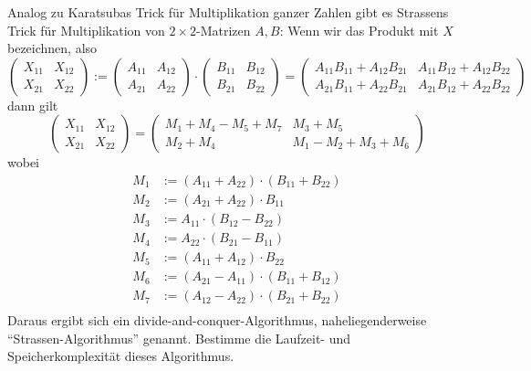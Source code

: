 \begin{sheet}
    \begin{problem}[title={Strassens Matrixmultiplikationsalgorithmus}]
        Analog zu Karatsubas Trick für Multiplikation ganzer Zahlen gibt es Strassens Trick für Multiplikation von $2\times 2$-Matrizen $A,B$: Wenn wir das Produkt mit $X$ bezeichnen, also
        \[ \begin{pmatrix}
               X_{11} & X_{12} \\ X_{21} & X_{22}
        \end{pmatrix} :=
        \begin{pmatrix}
            A_{11} & A_{12} \\ A_{21} & A_{22}
        \end{pmatrix} \cdot
        \begin{pmatrix}
            B_{11} & B_{12} \\ B_{21} & B_{22}
        \end{pmatrix} = \begin{pmatrix}
                            A_{11} B_{11}+ A_{12} B_{21}  & A_{11} B_{12} + A_{12} B_{22} \\
                            A_{21} B_{11} + A_{22} B_{21} & A_{21} B_{12} +A_{22} B_{22}
        \end{pmatrix}\]
        dann gilt
        \[\begin{pmatrix}
              X_{11} & X_{12} \\ X_{21} & X_{22}
        \end{pmatrix} =
        \begin{pmatrix}
            M_1 + M_4 - M_5 + M_7 & M_3 + M_5             \\
            M_2 + M_4             & M_1 - M_2 + M_3 + M_6
        \end{pmatrix}\]
        wobei
        \begin{align*}
            M_1 &:= (A_{11} + A_{22}) \cdot (B_{11} + B_{22}) \\
            M_2 &:= (A_{21} + A_{22}) \cdot B_{11} \\
            M_3 &:= A_{11} \cdot (B_{12} - B_{22}) \\
            M_4 &:= A_{22} \cdot (B_{21} - B_{11}) \\
            M_5 &:= (A_{11} + A_{12}) \cdot B_{22} \\
            M_6 &:= (A_{21} - A_{11}) \cdot (B_{11} + B_{12}) \\
            M_7 &:= (A_{12} - A_{22}) \cdot (B_{21} + B_{22}) \\
        \end{align*}
        Daraus ergibt sich ein divide-and-conquer-Algorithmus, naheliegenderweise \enquote{Strassen-Algorithmus} genannt. Bestimme die Laufzeit- und Speicherkomplexität dieses Algorithmus.
    \end{problem}


\end{sheet}
